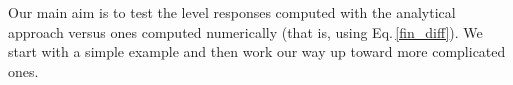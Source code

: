 \documentclass[referee]{aa}
\begin{document}
Our main aim is to test the level responses computed with the analytical approach versus ones computed numerically (that is, using Eq.\,\ref{fin_diff}). We start with a simple example and then work our way up toward more complicated ones. 




 
\end{document}
